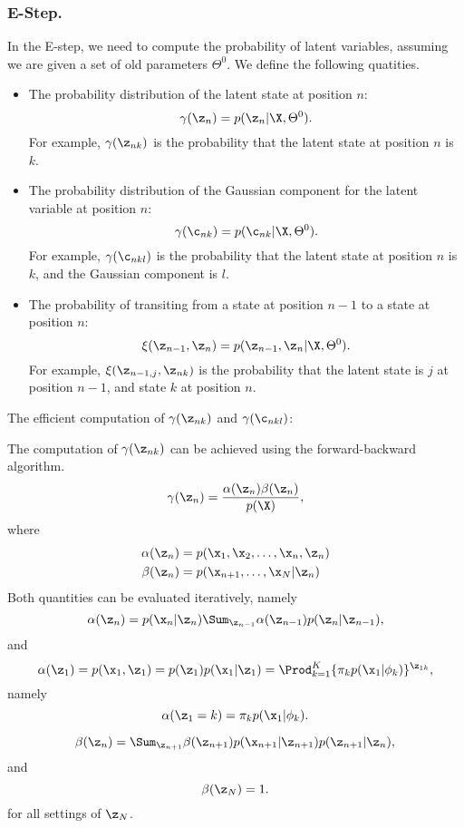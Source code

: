 \subsubsection{E-Step.}

In the E-step, we need to compute the probability of latent variables, assuming
we are given a set of old parameters $\Theta^0$. We define the following
quatities.

\begin{itemize}
  \item
    The probability distribution of the latent state at position $n$:
    $$
    \gamma(\z_n) = p(\z_n | \X, \Theta^0).
    $$
    For example, $\gamma(\z_{nk})$ is 
    the probability that the latent state at position $n$ is $k$.

  \item
    The probability distribution of the Gaussian component for the latent
    variable at position $n$:
    $$
    \gamma(\c_{nk}) = p(\c_{nk} | \X, \Theta^0).
    $$
    For example, $\gamma(\c_{nkl})$ is the probability
    that the latent state at position $n$ is $k$, and the Gaussian component is $l$.

  \item
    The probability of transiting from a state at position $n-1$ to a
    state at position $n$:
    $$
    \xi(\z_{n-1}, \z_n) = p(\z_{n-1}, \z_n | \X, \Theta^0).
    $$
    For example, $\xi(\z_{n-1, j}, \z_{nk})$ is the
    probability that the latent state is $j$ at position $n-1$, and state $k$ at
    position $n$.

\end{itemize}


The efficient computation of $\gamma(\z_{nk})$ and $\gamma(\c_{nkl})$:

The computation of $\gamma(\z_{nk})$ can be achieved using the forward-backward algorithm.
$$
\gamma(\z_{n}) = \frac{\alpha(\z_n) \beta(\z_n)}{p(\X)},
$$
where 
\begin{align*}
  \alpha(\z_n)  & =  p(\x_1, \x_2, \ldots, \x_n, \z_n) \\
  \beta(\z_n)  & =  p(\x_{n+1}, \ldots, \x_N | \z_n)
\end{align*}
Both quantities can be evaluated iteratively, namely
$$
\alpha(\z_n) = p(\x_n | \z_n) \Sum_{\z_{n-1}} \alpha(\z_{n-1}) p(\z_n | \z_{n-1}),
$$
and
$$
\alpha(\z_1) = p(\x_1, \z_1) = p(\z_1) p(\x_1 | \z_1) = \Prod_{k=1}^K \{\pi_k p(\x_1 | \phi_k)\}^{\z_{1k}},
$$
namely
$$
\alpha(\z_1 = k) = \pi_k p(\x_1 | \phi_k).
$$

$$
\beta(\z_n) = \Sum_{\z_{n+1}} \beta(\z_{n+1}) p(\x_{n+1} | \z_{n+1}) p(\z_{n+1} | \z_{n}),
$$
and
$$
\beta(\z_N) = 1.
$$
for all settings of $\z_N$.


